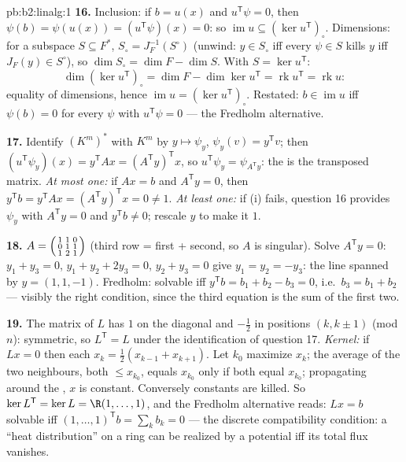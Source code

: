 \begin{solution}{pb:b2:linalg:1}
\textbf{16.} Inclusion: if $b = u(x)$ and $u^{\mathsf T}\psi =
0$, then $\psi(b) = \psi(u(x)) = (u^{\mathsf T}\psi)(x) = 0$: so
$\operatorname{im} u \subseteq (\ker u^{\mathsf T})_\circ$.
Dimensions: for a subspace $S \subseteq F^*$, $S_\circ =
J_F^{-1}(S^\circ)$ (unwind: $y \in S_\circ$ iff every $\psi \in
S$ kills $y$ iff $J_F(y) \in S^\circ$), so $\dim S_\circ = \dim
F - \dim S$. With $S = \ker u^{\mathsf T}$:
\[
\dim(\ker u^{\mathsf T})_\circ
= \dim F - \dim\ker u^{\mathsf T}
= \operatorname{rk} u^{\mathsf T} = \operatorname{rk} u :
\]
equality of dimensions, hence $\operatorname{im} u = (\ker
u^{\mathsf T})_\circ$. Restated: $b \in \operatorname{im} u$ iff
$\psi(b) = 0$ for every $\psi$ with $u^{\mathsf T}\psi = 0$ ---
the Fredholm alternative.

\textbf{17.} Identify $(K^m)^*$ with $K^m$ by $y \mapsto \psi_y$,
$\psi_y(v) = y^{\mathsf T}v$; then $(u^{\mathsf T}\psi_y)(x) =
y^{\mathsf T}Ax = (A^{\mathsf T}y)^{\mathsf T}x$, so $u^{\mathsf
T}\psi_y = \psi_{A^{\mathsf T}y}$: the  is the
transposed matrix. \emph{At most one:} if $Ax = b$ and
$A^{\mathsf T}y = 0$, then $y^{\mathsf T}b = y^{\mathsf T}Ax =
(A^{\mathsf T}y)^{\mathsf T}x = 0 \neq 1$. \emph{At least one:}
if (i) fails, question 16 provides $\psi_y$ with $A^{\mathsf T}y
= 0$ and $y^{\mathsf T}b \neq 0$; rescale $y$ to make it $1$.

\textbf{18.} $A = \begin{psmallmatrix} 1 & 1 & 0\\ 0 & 1 & 1\\
1 & 2 & 1\end{psmallmatrix}$ (third row = first + second, so $A$
is singular). Solve $A^{\mathsf T}y = 0$: $y_1 + y_3 = 0$, $y_1
+ y_2 + 2y_3 = 0$, $y_2 + y_3 = 0$ give $y_1 = y_2 = -y_3$: the
line spanned by $y = (1, 1, -1)$. Fredholm: solvable iff
$y^{\mathsf T}b = b_1 + b_2 - b_3 = 0$, i.e.\ $b_3 = b_1 + b_2$
--- visibly the right condition, since the third equation is the
sum of the first two.

\textbf{19.} The matrix of $L$ has $1$ on the diagonal and
$-\frac12$ in positions $(k, k\pm1)$ (mod $n$): symmetric, so
$L^{\mathsf T} = L$ under the identification of question 17.
\emph{Kernel:} if $Lx = 0$ then each $x_k = \frac12(x_{k-1} +
x_{k+1})$. Let $k_0$ maximize $x_k$; the average of the two
neighbours, both $\leq x_{k_0}$, equals $x_{k_0}$ only if both
equal $x_{k_0}$; propagating around the , $x$ is constant.
Conversely constants are killed. So $\ker L^{\mathsf T} = \ker L
= \R(1, \dots, 1)$, and the Fredholm alternative reads: $Lx = b$
solvable iff $(1,\dots,1)^{\mathsf T} b = \sum_k b_k = 0$ ---
the discrete compatibility condition: a ``heat distribution'' on
a ring can be realized by a potential iff its total flux
vanishes.


\end{solution}
